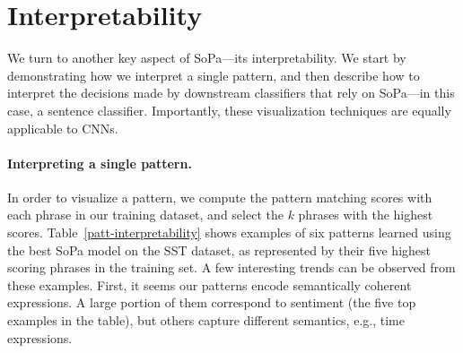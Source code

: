 \documentclass[11pt,a4paper]{article}
\newcommand{\isectionb}[1]{\section{#1}\label{sec:#1}}
\newcommand{\tabref}[1]{Table~\ref{#1}}
\newcommand{\softp}{pattern\xspace}
\newcommand{\SoftP}{SoPa\xspace}
\begin{document}
\isectionb{Interpretability}

We turn to another key aspect of \SoftP---its interpretability. 
We start by demonstrating how we interpret a single \softp, and then  describe
how to interpret the decisions made by downstream classifiers that
rely on \SoftP---in this case, a sentence classifier.
Importantly, these visualization techniques are equally applicable to CNNs.

 \paragraph{Interpreting a single pattern.}
In order to visualize a pattern, we compute the pattern matching scores with each phrase in our training dataset, 
and select the $k$ phrases with the highest scores.
\tabref{patt-interpretability} shows examples of six patterns learned using the best \SoftP model on the SST dataset,
as represented by their five highest scoring phrases in the training set.
A few interesting trends can be observed from these examples. 
First, it seems our patterns encode semantically coherent expressions.
A large portion of them correspond to sentiment (the five top examples in the table),
but others capture different semantics, e.g., time expressions.
\end{document}
